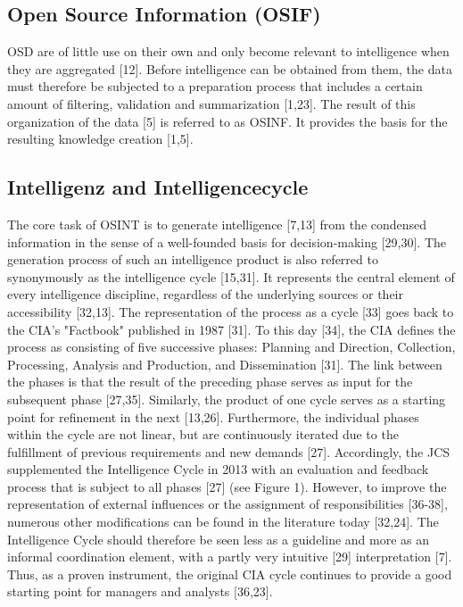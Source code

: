 \documentclass[10pt]{article}
\begin{document}
\subsection{Open Source Information (OSIF)}
OSD are of little use on their own and only become relevant to intelligence when they are aggregated [12]. Before intelligence can be obtained from them, the data must therefore be subjected to a preparation process that includes a certain amount of filtering, validation and summarization [1,23]. The result of this organization of the data [5] is referred to as OSINF. It provides the basis for the resulting knowledge creation [1,5].

\subsection{Intelligenz and Intelligencecycle}
The core task of OSINT is to generate intelligence [7,13] from the condensed information in the sense of a well-founded basis for decision-making [29,30]. The generation process of such an intelligence product is also referred to synonymously as the intelligence cycle [15,31]. It represents the central element of every intelligence discipline, regardless of the underlying sources or their accessibility [32,13]. The representation of the process as a cycle [33] goes back to the CIA's "Factbook" published in 1987 [31]. To this day [34], the CIA defines the process as consisting of five successive phases: Planning and Direction, Collection, Processing, Analysis and Production, and Dissemination [31]. The link between the phases is that the result of the preceding phase serves as input for the subsequent phase [27,35]. Similarly, the product of one cycle serves as a starting point for refinement in the next [13,26]. Furthermore, the individual phases within the cycle are not linear, but are continuously iterated due to the fulfillment of previous requirements and new demands [27]. Accordingly, the JCS supplemented the Intelligence Cycle in 2013 with an evaluation and feedback process that is subject to all phases [27] (see Figure 1). However, to improve the representation of external influences or the assignment of responsibilities [36-38], numerous other modifications can be found in the literature today [32,24]. The Intelligence Cycle should therefore be seen less as a guideline and more as an informal coordination element, with a partly very intuitive [29] interpretation [7]. Thus, as a proven instrument, the original CIA cycle continues to provide a good starting point for managers and analysts [36,23].
\end{document}
